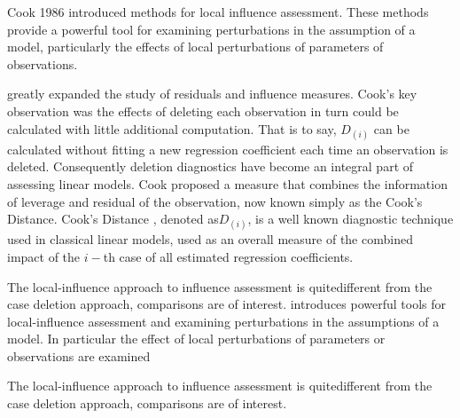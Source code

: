 \documentclass[12pt, a4paper]{report}
\theoremstyle{plain}
\theoremstyle{definition}
\theoremstyle{remark}
\begin{document}
		Cook 1986 introduced methods for local influence assessment. These methods provide a powerful tool for examining perturbations in the assumption of a model, particularly the effects of local perturbations of parameters of observations.
		
		
		\citet{cook77} greatly expanded the study of residuals and influence measures.  Cook's key observation was the effects of deleting each observation in turn could be calculated with little additional computation. That is to say, $D_{(i)}$ can be calculated without fitting a new regression coefficient each time an observation is deleted.  Consequently deletion diagnostics have become an integral part of assessing linear models. Cook proposed a measure that combines the information of leverage and residual of the observation, now known simply as the Cook's Distance. Cook's Distance , denoted as$D_{(i)}$, is a well known diagnostic technique used in classical linear models, used as an overall measure of the combined impact of the $i-$th case of all estimated regression coefficients.
		
		
		
		The local-influence approach to influence assessment is quitedifferent from the case deletion approach, comparisons are of
		interest.
		\citet{cook86} introduces powerful tools for local-influence assessment and examining perturbations in the assumptions of a model. In particular the effect of local perturbations of parameters or observations are examined	
		
		
		
		The local-influence approach to influence assessment is quitedifferent from the case deletion approach, comparisons are of
		interest.
		
		
		
		
		
		
		
		
		
		
\end{document}
